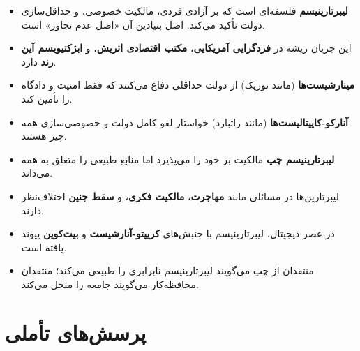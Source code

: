 \begin{tcolorbox}[
    enhanced,
    colback=lightbg,
    colframe=darkgray,
    boxrule=2pt,
    arc=8pt,
    fonttitle=\bfseries\large,
    title={\rl{📝 خلاصهٔ فصل یازدهم}}
]
\begin{itemize}
    \item \textbf{لیبرتارینیسم} فلسفه‌ای است که بر آزادی فردی، مالکیت خصوصی، و حداقل‌سازی دولت تأکید می‌کند. اصل بنیادین آن «اصل عدم تجاوز» است.
    
    \item این جریان ریشه در \textbf{فردگرایی آمریکایی}، \textbf{مکتب اقتصادی اتریش}، و \textbf{ابژکتیویسم آین رند} دارد.
    
    \item \textbf{مینارشیست‌ها} (مانند نوزیک) از دولت حداقلی دفاع می‌کنند که فقط امنیت و دادگاه را تأمین کند.
    
    \item \textbf{آنارکو-کاپیتالیست‌ها} (مانند راتبارد) خواستار لغو کامل دولت و خصوصی‌سازی همه چیز هستند.
    
    \item \textbf{لیبرتارینیسم چپ} مالکیت بر خود را می‌پذیرد اما منابع طبیعی را متعلق به همه می‌داند.
    
    \item لیبرتارین‌ها در مسائلی مانند \textbf{مهاجرت}، \textbf{مالکیت فکری}، و \textbf{سقط جنین} اختلاف‌نظر دارند.
    
    \item در عصر دیجیتال، لیبرتارینیسم با جنبش‌های \textbf{کریپتو-آنارشیست} و \textbf{بیت‌کوین} پیوند یافته است.
    
    \item منتقدان از چپ می‌گویند لیبرتارینیسم نابرابری را طبیعی می‌کند؛ منتقدان محافظه‌کار می‌گویند جامعه را منحل می‌کند.
\end{itemize}
\end{tcolorbox}

\section*{پرسش‌های تأملی}

